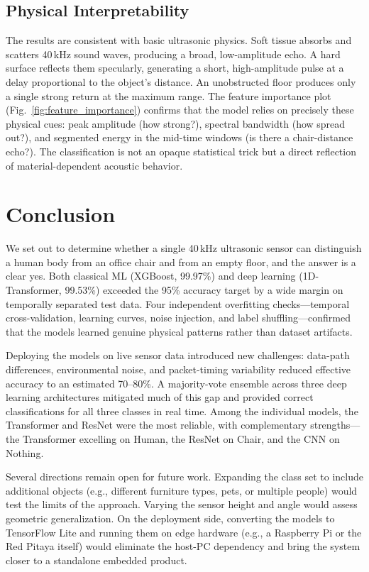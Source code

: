 \documentclass[conference,a4paper]{IEEEtran}
\begin{document}
\subsection{Physical Interpretability}

The results are consistent with basic ultrasonic physics. Soft tissue absorbs and scatters 40\,kHz sound waves, producing a broad, low-amplitude echo. A hard surface reflects them specularly, generating a short, high-amplitude pulse at a delay proportional to the object's distance. An unobstructed floor produces only a single strong return at the maximum range. The feature importance plot (Fig.~\ref{fig:feature_importance}) confirms that the model relies on precisely these physical cues: peak amplitude (how strong?), spectral bandwidth (how spread out?), and segmented energy in the mid-time windows (is there a chair-distance echo?). The classification is not an opaque statistical trick but a direct reflection of material-dependent acoustic behavior.

\section{Conclusion}

We set out to determine whether a single 40\,kHz ultrasonic sensor can distinguish a human body from an office chair and from an empty floor, and the answer is a clear yes. Both classical ML (XGBoost, 99.97\%) and deep learning (1D-Transformer, 99.53\%) exceeded the 95\% accuracy target by a wide margin on temporally separated test data. Four independent overfitting checks---temporal cross-validation, learning curves, noise injection, and label shuffling---confirmed that the models learned genuine physical patterns rather than dataset artifacts.

Deploying the models on live sensor data introduced new challenges: data-path differences, environmental noise, and packet-timing variability reduced effective accuracy to an estimated 70--80\%. A majority-vote ensemble across three deep learning architectures mitigated much of this gap and provided correct classifications for all three classes in real time. Among the individual models, the Transformer and ResNet were the most reliable, with complementary strengths---the Transformer excelling on Human, the ResNet on Chair, and the CNN on Nothing.

Several directions remain open for future work. Expanding the class set to include additional objects (e.g., different furniture types, pets, or multiple people) would test the limits of the approach. Varying the sensor height and angle would assess geometric generalization. On the deployment side, converting the models to TensorFlow Lite and running them on edge hardware (e.g., a Raspberry Pi or the Red Pitaya itself) would eliminate the host-PC dependency and bring the system closer to a standalone embedded product.
\end{document}
